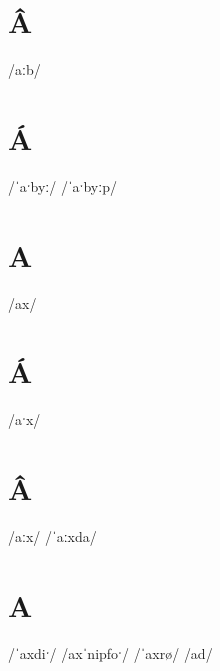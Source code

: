 \documentclass[10pt,a4paper,twoside]{book}
\begin{document}
\section*{Â}

\begin{multicols}{3}
 {/aːb/} {}
\end{multicols}

\section*{Á}

\begin{multicols}{3}
 {/ˈaˑbyː/} {}
 {/ˈaˑbyːp/} {}
\end{multicols}

\section*{A}

\begin{multicols}{3}
 {/ax/} {}
\end{multicols}

\section*{Á}

\begin{multicols}{3}
 {/aˑx/} {}
\end{multicols}

\section*{Â}

\begin{multicols}{3}
 {/aːx/} {}
 {/ˈaːxda/} {}
\end{multicols}

\section*{A}

\begin{multicols}{3}
 {/ˈaxdiˑ/} {}
 {/axˈnipfoˑ/} {}
 {/ˈaxrø/} {}
 {/ad/} {}
\end{multicols}
\end{document}
